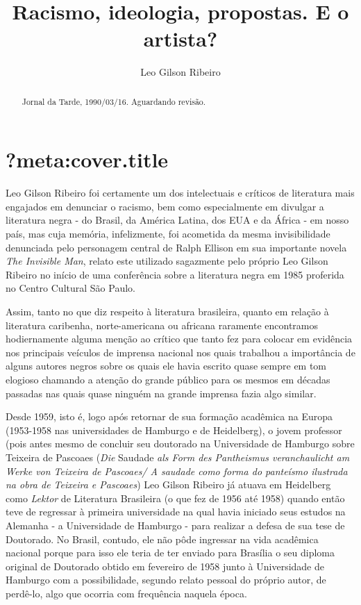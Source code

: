 \documentclass[
  letterpaper,
  DIV=11,
  numbers=noendperiod]{scrreprt}
\title{Racismo, ideologia, propostas. E o artista?}
\author{Leo Gilson Ribeiro}
\date{}
\renewcommand*\contentsname{Table of contents}
\newcommand\contentsname{Table of contents}
\begin{document}
\maketitle
\begin{abstract}
Jornal da Tarde, 1990/03/16. Aguardando revisão.
\end{abstract}

\renewcommand*\contentsname{Table of contents}
{
\hypersetup{linkcolor=}
\setcounter{tocdepth}{2}
\tableofcontents
}

\chapter*{\texorpdfstring{\textbf{?meta:cover.title}}{?meta:cover.title}}\label{section}


Leo Gilson Ribeiro foi certamente um dos intelectuais e críticos de
literatura mais engajados em denunciar o racismo, bem como especialmente
em divulgar a literatura negra - do Brasil, da América Latina, dos EUA e
da África - em nosso país, mas cuja memória, infelizmente, foi acometida
da mesma invisibilidade denunciada pelo personagem central de Ralph
Ellison em sua importante novela \emph{The Invisible Man}, relato este
utilizado sagazmente pelo próprio Leo Gilson Ribeiro no início de uma
conferência sobre a literatura negra em 1985 proferida no Centro
Cultural São Paulo.

Assim, tanto no que diz respeito à literatura brasileira, quanto em
relação à literatura caribenha, norte-americana ou africana raramente
encontramos hodiernamente alguma menção ao crítico que tanto fez para
colocar em evidência nos principais veículos de imprensa nacional nos
quais trabalhou a importância de alguns autores negros sobre os quais
ele havia escrito quase sempre em tom elogioso chamando a atenção do
grande público para os mesmos em décadas passadas nas quais quase
ninguém na grande imprensa fazia algo similar.

Desde 1959, isto é, logo após retornar de sua formação acadêmica na
Europa (1953-1958 nas universidades de Hamburgo e de Heidelberg), o
jovem professor (pois antes mesmo de concluir seu doutorado na
Universidade de Hamburgo sobre Teixeira de Pascoaes (\emph{Die} Saudade
\emph{als Form des Pantheismus veranchaulicht am Werke von Teixeira de
Pascoaes/ A saudade como forma do panteísmo ilustrada na obra de
Teixeira e Pascoaes}) Leo Gilson Ribeiro já atuava em Heidelberg como
\emph{Lektor} de Literatura Brasileira (o que fez de 1956 até 1958)
quando então teve de regressar à primeira universidade na qual havia
iniciado seus estudos na Alemanha - a Universidade de Hamburgo - para
realizar a defesa de sua tese de Doutorado. No Brasil, contudo, ele não
pôde ingressar na vida acadêmica nacional porque para isso ele teria de
ter enviado para Brasília o seu diploma original de Doutorado obtido em
fevereiro de 1958 junto à Universidade de Hamburgo com a possibilidade,
segundo relato pessoal do próprio autor, de perdê-lo, algo que ocorria
com frequência naquela época.
\end{document}
